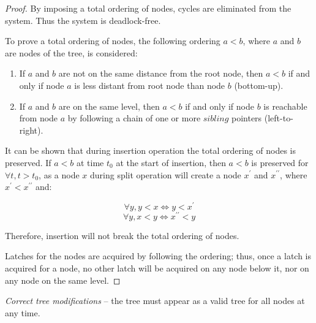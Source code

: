 \begin{proof}
  By imposing a total ordering of nodes, cycles are eliminated from the system. Thus the system is deadlock-free.

  To prove a total ordering of nodes, the following ordering $a < b$, where $a$ and $b$ are nodes of the tree, is considered:

  \begin{enumerate}
    \item If $a$ and $b$ are not on the same distance from the root node, then $a < b$ if and only if node $a$ is less distant from root node than node $b$ (bottom-up).
    \item If $a$ and $b$ are on the same level, then $a < b$ if and only if node $b$ is reachable from node $a$ by following a chain of one or more $sibling$ pointers (left-to-right).
  \end{enumerate}

  It can be shown that during insertion operation the total ordering of nodes is preserved. If $a < b$ at time $t_0$ at the start of insertion, then $a < b$ is preserved for $\forall t, t > t_0$, as a node $x$ during split operation will create a node $x^\prime$ and $x^{\prime\prime}$, where $x^\prime < x^{\prime\prime}$ and:

  $$\forall y, y < x \Leftrightarrow y < x^\prime$$
  $$\forall y, x < y \Leftrightarrow x^{\prime\prime} < y$$

  Therefore, insertion will not break the total ordering of nodes.

  Latches for the nodes are acquired by following the ordering; thus, once a latch is acquired for a node, no other latch will be acquired on any node below it, nor on any node on the same level.
\end{proof}

\begin{theorem}\label{theorem:b-link-tree:modifications}
  \textit{Correct tree modifications} -- the tree must appear as a valid tree for all nodes at any time.
\end{theorem}

